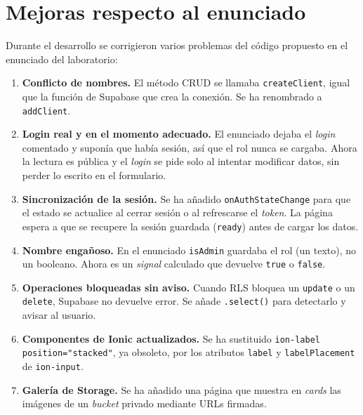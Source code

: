 \documentclass[a4paper, 12pt]{article}
\begin{document}
\section{Mejoras respecto al enunciado}

Durante el desarrollo se corrigieron varios problemas del código propuesto en
el enunciado del laboratorio:

\begin{enumerate}
  \item \textbf{Conflicto de nombres.} El método CRUD se llamaba
        \texttt{createClient}, igual que la función de Supabase que crea la
        conexión. Se ha renombrado a \texttt{addClient}.
  \item \textbf{Login real y en el momento adecuado.} El enunciado dejaba el
        \textit{login} comentado y suponía que había sesión, así que el rol
        nunca se cargaba. Ahora la lectura es pública y el \textit{login} se
        pide solo al intentar modificar datos, sin perder lo escrito en el
        formulario.
  \item \textbf{Sincronización de la sesión.} Se ha añadido
        \texttt{onAuthStateChange} para que el estado se actualice al cerrar
        sesión o al refrescarse el \textit{token}. La página espera a que se
        recupere la sesión guardada (\texttt{ready}) antes de cargar los datos.
  \item \textbf{Nombre engañoso.} En el enunciado \texttt{isAdmin} guardaba el
        rol (un texto), no un booleano. Ahora es un \textit{signal} calculado
        que devuelve \texttt{true} o \texttt{false}.
  \item \textbf{Operaciones bloqueadas sin aviso.} Cuando RLS bloquea un
        \texttt{update} o un \texttt{delete}, Supabase no devuelve error. Se
        añade \texttt{.select()} para detectarlo y avisar al usuario.
  \item \textbf{Componentes de Ionic actualizados.} Se ha sustituido
        \texttt{ion-label position="stacked"}, ya obsoleto, por los atributos
        \texttt{label} y \texttt{labelPlacement} de \texttt{ion-input}.
  \item \textbf{Galería de Storage.} Se ha añadido una página que muestra en
        \textit{cards} las imágenes de un \textit{bucket} privado mediante URLs
        firmadas.
\end{enumerate}
\end{document}
